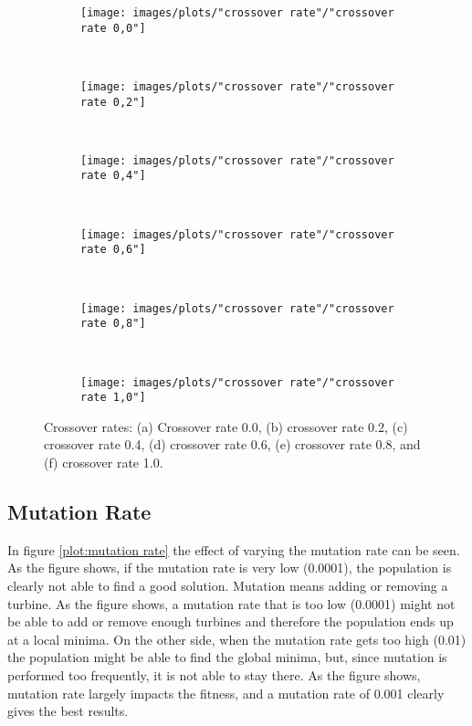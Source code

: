 \begin{figure}[h!]
    \centering
    \begin{subfigure}[b]{0.31\textwidth}
        \texttt{[image: images/plots/"crossover rate"/"crossover rate 0,0"]}
        \caption{}
        \hfill
        \label{plot:crossover rate 0.0}
    \end{subfigure}
    ~
    \begin{subfigure}[b]{0.31\textwidth}
        \texttt{[image: images/plots/"crossover rate"/"crossover rate 0,2"]}
        \caption{}
        \hfill
        \label{plot:two point crossover}
    \end{subfigure}
    ~
       \begin{subfigure}[b]{0.31\textwidth}
        \texttt{[image: images/plots/"crossover rate"/"crossover rate 0,4"]}
        \caption{}
        \hfill
        \label{plot:two point crossover}
    \end{subfigure}
    ~
       \begin{subfigure}[b]{0.31\textwidth}
        \texttt{[image: images/plots/"crossover rate"/"crossover rate 0,6"]}
        \caption{}
        \hfill
        \label{plot:two point crossover}
    \end{subfigure}
    ~
       \begin{subfigure}[b]{0.31\textwidth}
        \texttt{[image: images/plots/"crossover rate"/"crossover rate 0,8"]}
        \caption{}
        \hfill
        \label{plot:two point crossover}
    \end{subfigure}
    ~
    \begin{subfigure}[b]{0.31\textwidth}
        \texttt{[image: images/plots/"crossover rate"/"crossover rate 1,0"]}
        \caption{}
        \hfill
        \label{plot:uniform crossover}
    \end{subfigure}
    \caption{Crossover rates: (a) Crossover rate 0.0, (b) crossover rate 0.2, (c) crossover rate 0.4, (d) crossover rate 0.6, (e) crossover rate 0.8, and (f) crossover rate 1.0.}
    \label{plot:crossover methods}
\end{figure}


\subsection{Mutation Rate}
In figure \ref{plot:mutation rate} the effect of varying the mutation rate can be seen. As the figure shows, if the mutation rate is very low (0.0001), the population is clearly not able to find a good solution. Mutation means adding or removing a turbine. As the figure shows, a mutation rate that is too low (0.0001) might not be able to add or remove enough turbines and therefore the population ends up at a local minima. On the other side, when the mutation rate gets too high (0.01) the population might be able to find the global minima, but, since mutation is performed too frequently, it is not able to stay there. As the figure shows, mutation rate largely impacts the fitness, and a mutation rate of 0.001 clearly gives the best results.


